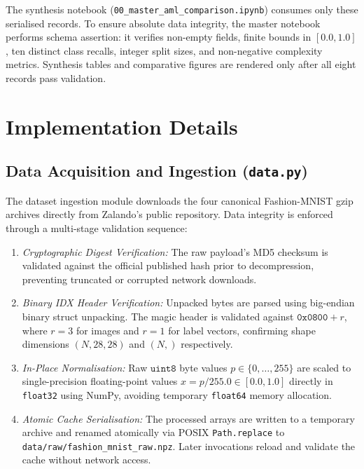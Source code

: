 \documentclass[conference]{IEEEtran}
\newcommand{\code}[1]{\texttt{#1}}
\newcommand{\file}[1]{\texttt{#1}}
\newcommand{\repopath}[1]{\nolinkurl{#1}}
\begin{document}
The synthesis notebook
(\repopath{00_master_aml_comparison.ipynb}) consumes
only these serialised records. To ensure absolute data integrity, the
master notebook performs schema assertion: it verifies non-empty fields,
finite bounds in $[0.0, 1.0]$, ten distinct class recalls, integer split
sizes, and non-negative complexity metrics. Synthesis tables and
comparative figures are rendered only after all eight records pass
validation.

\section{Implementation Details}
\label{sec:impl}

\subsection{Data Acquisition and Ingestion (\file{data.py})}
The dataset ingestion module downloads the four canonical Fashion-MNIST
gzip archives directly from Zalando's public repository. Data integrity is
enforced through a multi-stage validation sequence:
\begin{enumerate}
  \item \emph{Cryptographic Digest Verification:} The raw payload's MD5
    checksum is validated against the official published hash prior to
    decompression, preventing truncated or corrupted network downloads.
  \item \emph{Binary IDX Header Verification:} Unpacked bytes are parsed
    using big-endian binary struct unpacking. The magic header is
    validated against $\mathtt{0x0800} + r$, where $r=3$ for images and
    $r=1$ for label vectors, confirming shape dimensions $(N, 28, 28)$
    and $(N,)$ respectively.
  \item \emph{In-Place Normalisation:} Raw $\code{uint8}$ byte values
    $p \in \{0, \dots, 255\}$ are scaled to single-precision floating-point
    values $x = p / 255.0 \in [0.0, 1.0]$ directly in \code{float32} using
    NumPy, avoiding temporary \code{float64} memory allocation.
  \item \emph{Atomic Cache Serialisation:} The processed arrays are written
    to a temporary archive and renamed atomically via POSIX
    \code{Path.replace} to \repopath{data/raw/fashion_mnist_raw.npz}.
    Later invocations reload and validate the cache without network access.
\end{enumerate}
\end{document}
